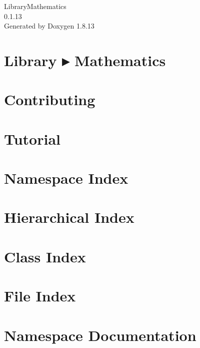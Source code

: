 \documentclass[twoside]{book}
\newcommand{\+}{\discretionary{\mbox{\scriptsize$\hookleftarrow$}}{}{}}
\newcommand{\clearemptydoublepage}{%
  \newpage{\pagestyle{empty}\cleardoublepage}%
}
\begin{document}
\hypersetup{pageanchor=false,
             bookmarksnumbered=true,
             pdfencoding=unicode
            }
\begin{titlepage}
\vspace*{7cm}
\begin{center}%
{\Large Library\+Mathematics \\[1ex]\large 0.\+1.\+13 }\\
\vspace*{1cm}
{\large Generated by Doxygen 1.8.13}\\
\end{center}
\end{titlepage}
\clearemptydoublepage
{}
\tableofcontents
\clearemptydoublepage
{}
\hypersetup{pageanchor=true}

\chapter{Library ▸ Mathematics}
\label{index}\hypertarget{index}{}
\chapter{Contributing}
\label{md__c_o_n_t_r_i_b_u_t_i_n_g}

\chapter{Tutorial}
\label{md_docs__tutorial}

\chapter{Namespace Index}

\chapter{Hierarchical Index}

\chapter{Class Index}

\chapter{File Index}

\chapter{Namespace Documentation}










\end{document}
